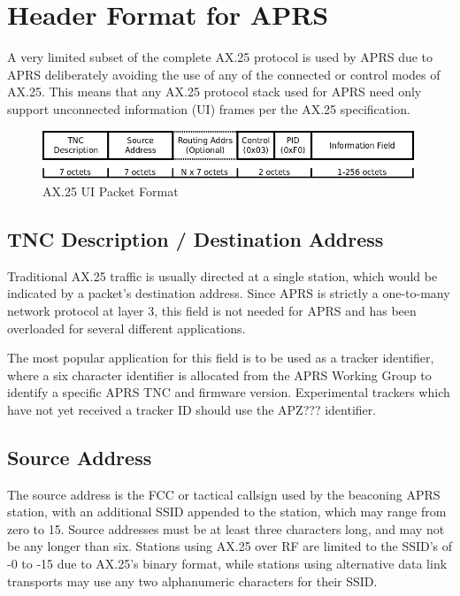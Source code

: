 \section{Header Format for APRS}

A very limited subset of the complete AX.25 protocol is used by APRS due to APRS 
deliberately avoiding the use of any of the connected or control modes of AX.25. This 
means that any AX.25 protocol stack used for APRS need only support unconnected information (UI)
frames per the AX.25 specification.

\begin{figure}
	\centering
	\includegraphics[width=1.0\textwidth]{src/dia/ax25ui}
	\caption{AX.25 UI Packet Format}
	\label{ax25uiformat}
\end{figure}

\subsection{TNC Description / Destination Address}

Traditional AX.25 traffic is usually directed at a single station, which would be indicated by 
a packet's destination address. Since APRS is strictly a one-to-many network protocol at layer 3, this field
is not needed for APRS and has been overloaded for several different applications.

The most popular application for this field is to be used as a tracker identifier, where a
six character identifier is allocated from the APRS Working Group to identify a specific 
APRS TNC and firmware version. Experimental trackers which have not yet received a tracker ID
should use the APZ??? identifier.

\subsection{Source Address}

The source address is the FCC or tactical callsign used by the beaconing APRS station, with an 
additional SSID appended to the station, which may range from zero to 15. Source addresses must 
be at least three characters long, and may not be any longer than six. Stations using AX.25 
over RF are limited to the SSID's of -0 to -15 due to AX.25's binary format, 
while stations using alternative data link transports may use any 
two alphanumeric characters for their SSID.

